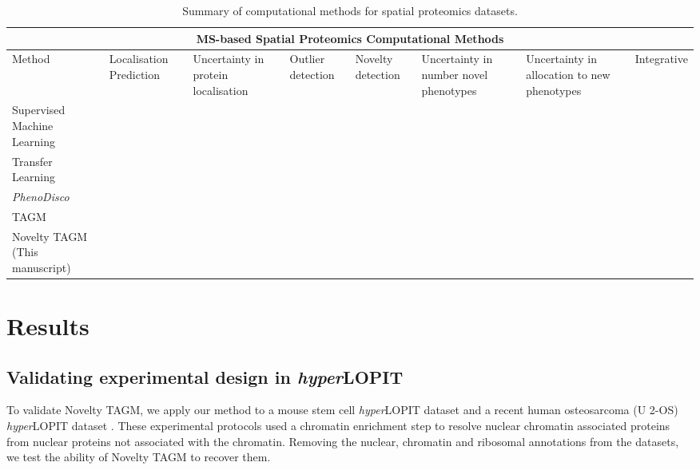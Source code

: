 \documentclass[12pt,english]{article}
\newcommand{\xmark}{\ding{55}}
\begin{document}
\begin{table}[h]
	\centering
	\footnotesize
	\hspace*{-1.5cm}
	\begin{tabular}{ |p{2.5cm}|p{2cm}|p{2cm}|p{1.5cm}|p{2cm}|p{2cm}|p{2cm}|p{2cm}|  }
		\hline
		\multicolumn{8}{|c|}{MS-based Spatial Proteomics Computational Methods} \\
		\hline
		 Method & Localisation Prediction & Uncertainty in protein localisation & Outlier detection  & Novelty detection & Uncertainty in number novel phenotypes & Uncertainty in allocation to new phenotypes & Integrative \\
		\hline
		\hline
		Supervised Machine Learning\citep{Gatto:2014b}  & \vfill\hfil \checkmark & \vfill\hfil\xmark & \vfill\hfil\xmark &\vfill\hfil\xmark&\vfill\hfil\xmark&\vfill\hfil\xmark& \vfill\hfil\xmark\\
		\hline
		Transfer Learning \citep{Breckels:2016}  & \vfill\hfil \checkmark  & \vfill\hfil\xmark& \vfill\hfil\xmark &\vfill\hfil\xmark&\vfill\hfil\xmark& \vfill\hfil\xmark&\vfill\hfil \checkmark\\
		\hline
		\textit{PhenoDisco} \citep{Breckels:2013}  & \vfill\hfil\xmark &\vfill\hfil\xmark &\vfill\hfil \checkmark &\vfill\hfil \checkmark&\vfill\hfil\xmark&\vfill\hfil\xmark& \vfill\hfil\xmark\\
		\hline
		TAGM \citep{Crook:2018}& \vfill\hfil \checkmark & \vfill\hfil \checkmark & \vfill\hfil \checkmark& \vfill\hfil\xmark&\vfill\hfil\xmark&\vfill\hfil\xmark&\vfill\hfil\xmark\\
		\hline
		Novelty TAGM (This manuscript)&  \vfill\hfil \checkmark & \vfill\hfil \checkmark &\vfill\hfil \checkmark & \vfill\hfil \checkmark&\vfill\hfil \checkmark&\vfill\hfil \checkmark& \vfill\hfil\xmark\\
		\hline
		\hline
	\end{tabular}
	\caption{Summary of computational methods for spatial  proteomics datasets.}
	\label{table:methods}
\end{table}
\clearpage
\section{Results}
\subsection{Validating experimental design in \textit{hyper}LOPIT}
To validate Novelty TAGM, we apply our method to a mouse stem cell \textit{hyper}LOPIT dataset \citep{hyper} and a recent human osteosarcoma (U 2-OS) \textit{hyper}LOPIT dataset \citep{Thul:2017, DC:2018}. These experimental protocols used a chromatin enrichment step to resolve nuclear chromatin associated proteins from nuclear proteins not associated with the chromatin. Removing the nuclear, chromatin and ribosomal annotations from the datasets, we test the ability of Novelty TAGM to recover them.
\end{document}
